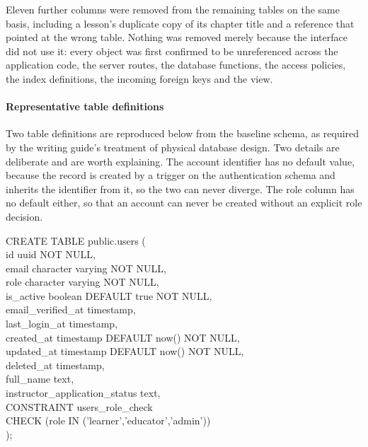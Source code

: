 \documentclass[12pt, oneside]{article} %
\begin{document}
Eleven further columns were removed from the remaining tables on the same basis, including a lesson's duplicate copy of its chapter title and a reference that pointed at the wrong table. Nothing was removed merely because the interface did not use it: every object was first confirmed to be unreferenced across the application code, the server routes, the database functions, the access policies, the index definitions, the incoming foreign keys and the view.

\paragraph{Representative table definitions}

Two table definitions are reproduced below from the baseline schema, as required by the writing guide's treatment of physical database design. Two details are deliberate and are worth explaining. The account identifier has no default value, because the record is created by a trigger on the authentication schema and inherits the identifier from it, so the two can never diverge. The role column has no default either, so that an account can never be created without an explicit role decision.

\begin{tcolorbox}[listing only, breakable, boxsep=2pt, left=2pt, right=2pt]
\footnotesize\ttfamily
CREATE TABLE public.users ( \\
\hspace*{4mm}id uuid NOT NULL, \\
\hspace*{4mm}email character varying NOT NULL, \\
\hspace*{4mm}role character varying NOT NULL, \\
\hspace*{4mm}is\_active boolean DEFAULT true NOT NULL, \\
\hspace*{4mm}email\_verified\_at timestamp, \\
\hspace*{4mm}last\_login\_at timestamp, \\
\hspace*{4mm}created\_at timestamp DEFAULT now() NOT NULL, \\
\hspace*{4mm}updated\_at timestamp DEFAULT now() NOT NULL, \\
\hspace*{4mm}deleted\_at timestamp, \\
\hspace*{4mm}full\_name text, \\
\hspace*{4mm}instructor\_application\_status text, \\
\hspace*{4mm}CONSTRAINT users\_role\_check \\
\hspace*{8mm}CHECK (role IN ('learner','educator','admin')) \\
);
\end{tcolorbox}
\end{document}
